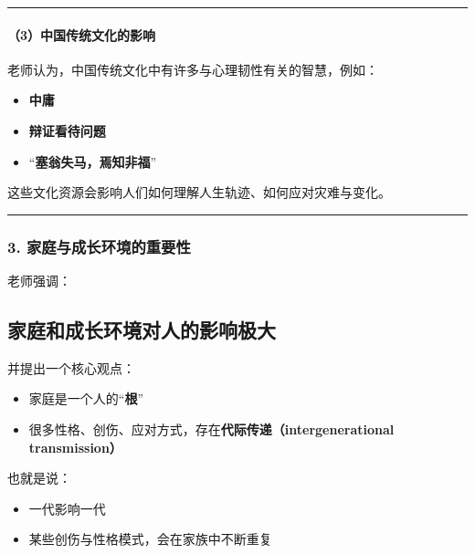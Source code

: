 \documentclass[
  chinese,
  9pt,
  a4paper,
]{ctexart}
\providecommand{\tightlist}{%
  \setlength{\itemsep}{0pt}\setlength{\parskip}{0pt}}
\begin{document}
\begin{center}\rule{0.5\linewidth}{0.5pt}\end{center}

\paragraph{（3）中国传统文化的影响}\label{ux4e2dux56fdux4f20ux7edfux6587ux5316ux7684ux5f71ux54cd}

老师认为，中国传统文化中有许多与心理韧性有关的智慧，例如：

\begin{itemize}
\tightlist
\item
  \textbf{中庸}
\item
  \textbf{辩证看待问题}
\item
  ``\textbf{塞翁失马，焉知非福}''
\end{itemize}

这些文化资源会影响人们如何理解人生轨迹、如何应对灾难与变化。

\begin{center}\rule{0.5\linewidth}{0.5pt}\end{center}

\subsubsection{3.
家庭与成长环境的重要性}\label{ux5bb6ux5eadux4e0eux6210ux957fux73afux5883ux7684ux91cdux8981ux6027}

老师强调：

\subsection{家庭和成长环境对人的影响极大}\label{ux5bb6ux5eadux548cux6210ux957fux73afux5883ux5bf9ux4ebaux7684ux5f71ux54cdux6781ux5927}

并提出一个核心观点：

\begin{itemize}
\tightlist
\item
  家庭是一个人的``\textbf{根}''
\item
  很多性格、创伤、应对方式，存在\textbf{代际传递（intergenerational
  transmission）}
\end{itemize}

也就是说：

\begin{itemize}
\tightlist
\item
  一代影响一代
\item
  某些创伤与性格模式，会在家族中不断重复
\end{itemize}
\end{document}
